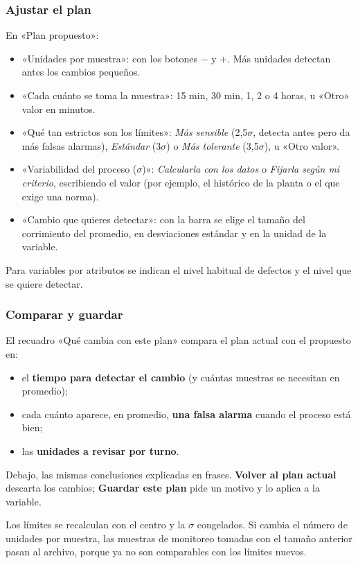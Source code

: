 \documentclass[11pt,a4paper]{article}
\newcommand{\boton}[1]{\textbf{#1}}                      %
\newcommand{\campo}[1]{«#1»}                             %
\begin{document}
\subsubsection{Ajustar el plan}
En \campo{Plan propuesto}:
\begin{itemize}
\item \campo{Unidades por muestra}: con los botones $-$ y $+$. Más unidades detectan antes los
  cambios pequeños.
\item \campo{Cada cuánto se toma la muestra}: 15 min, 30 min, 1, 2 o 4 horas, u \campo{Otro} valor
  en minutos.
\item \campo{Qué tan estrictos son los límites}: \emph{Más sensible} (2,5$\sigma$, detecta antes
  pero da más falsas alarmas), \emph{Estándar} (3$\sigma$) o \emph{Más tolerante} (3,5$\sigma$), u
  \campo{Otro valor}.
\item \campo{Variabilidad del proceso ($\sigma$)}: \emph{Calcularla con los datos} o \emph{Fijarla
  según mi criterio}, escribiendo el valor (por ejemplo, el histórico de la planta o el que exige
  una norma).
\item \campo{Cambio que quieres detectar}: con la barra se elige el tamaño del corrimiento del
  promedio, en desviaciones estándar y en la unidad de la variable.
\end{itemize}
Para variables por atributos se indican el nivel habitual de defectos y el nivel que se quiere
detectar.

\subsubsection{Comparar y guardar}
El recuadro \campo{Qué cambia con este plan} compara el plan actual con el propuesto en:
\begin{itemize}
\item el \textbf{tiempo para detectar el cambio} (y cuántas muestras se necesitan en promedio);
\item cada cuánto aparece, en promedio, \textbf{una falsa alarma} cuando el proceso está bien;
\item las \textbf{unidades a revisar por turno}.
\end{itemize}
Debajo, las mismas conclusiones explicadas en frases. \boton{Volver al plan actual} descarta los
cambios; \boton{Guardar este plan} pide un motivo y lo aplica a la variable.

\begin{cuidado}
Los límites se recalculan con el centro y la $\sigma$ congelados. Si cambia el número de unidades
por muestra, las muestras de monitoreo tomadas con el tamaño anterior pasan al archivo, porque ya
no son comparables con los límites nuevos.
\end{cuidado}
\end{document}

